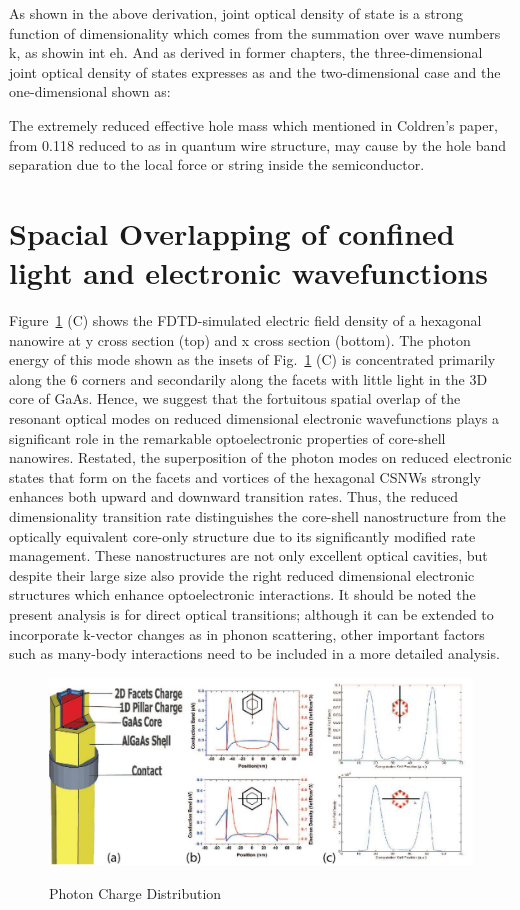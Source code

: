 As shown in the above derivation, joint optical density of state is a strong function of dimensionality which comes from the summation over wave numbers k, as showin int eh. And as derived in former chapters, the three-dimensional joint optical density of states expresses as
and the two-dimensional case and the one-dimensional shown as:

The extremely reduced effective hole mass which mentioned in Coldren's paper, from 0.118 reduced to as in quantum wire structure, may cause by the hole band separation due to the local force or string inside the semiconductor.

\section{Spacial Overlapping of confined light and electronic wavefunctions}

Figure~\ref{PhotonCharge} (C) shows the FDTD-simulated electric field density
of a hexagonal nanowire at y cross section (top) and x cross section (bottom).
The photon energy of this mode shown as the insets of Fig.~\ref{PhotonCharge}
(C) is concentrated primarily along the 6 corners and secondarily along the
facets with little light in the 3D core of GaAs. Hence, we suggest that the
fortuitous spatial overlap of the resonant optical modes on reduced dimensional
electronic wavefunctions plays a significant role in the remarkable
optoelectronic properties of core-shell nanowires. Restated, the superposition
of the photon modes  on reduced electronic states that form on the facets and
vortices of the hexagonal CSNWs strongly enhances both upward and downward
transition rates.  Thus, the reduced dimensionality transition rate
distinguishes the core-shell nanostructure from the optically equivalent
core-only structure due to its significantly modified rate management. These
nanostructures are not only excellent optical cavities, but despite their large
size also provide the right reduced dimensional electronic structures which
enhance optoelectronic interactions.  It should be noted the present analysis
is for direct optical transitions; although it can be extended to incorporate
k-vector changes as in phonon scattering, other important factors such as
many-body interactions need to be included in a more detailed analysis.


\begin{figure}
  \caption{Photon Charge Distribution}
  \centering
  \includegraphics[width=\textwidth]{pictures/ED/Photoncharge}
  \label{PhotonCharge}
\end{figure}

